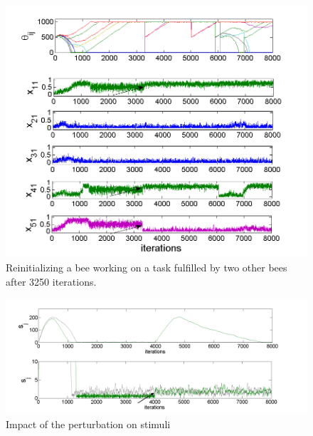 \begin{figure}[ht!]
\centering{}\includegraphics[scale=0.6]{figures/Figure2.png}\caption{Reinitializing a bee working on a task fulfilled by two other bees after 3250 iterations.}
\label{fig:figure2}
\end{figure}

\begin{figure}[ht!]
\centering{}\includegraphics[scale=0.35]{figures/Figure7.png}\caption{Impact of the perturbation on stimuli}
\label{fig:figure3}
\end{figure}


